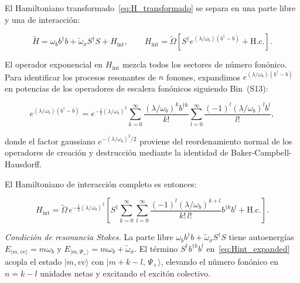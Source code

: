 \documentclass[12pt]{article}
\begin{document}
	
	El Hamiltoniano transformado~\eqref{eq:H_transformado} se separa en
	una parte libre y una de interacci\'on:
	
	\begin{equation}
		\widetilde{H} = \omega_b b^\dagger b + \widetilde\omega_\sigma S^\dagger S
		+ H_\mathrm{int},
		\qquad
		H_\mathrm{int} = \widetilde\Omega\left[
		S^\dagger e^{(\lambda/\omega_b)(b^\dagger - b)}
		+ \mathrm{H.c.}
		\right].
		\label{eq:Hint}
	\end{equation}
	
	\noindent
	El operador exponencial en $H_\mathrm{int}$ mezcla todos los sectores
	de n\'umero fon\'onico. Para identificar los procesos resonantes de
	$n$ fonones, expandimos $e^{(\lambda/\omega_b)(b^\dagger - b)}$ en
	potencias de los operadores de escalera fon\'onicos siguiendo
	Bin~(S13):
	
	\begin{equation}
		e^{(\lambda/\omega_b)(b^\dagger - b)}
		= e^{-\frac{1}{2}(\lambda/\omega_b)^2}
		\sum_{k=0}^\infty \frac{(\lambda/\omega_b)^k b^{\dagger k}}{k!}
		\sum_{l=0}^\infty \frac{(-1)^l(\lambda/\omega_b)^l b^l}{l!},
		\label{eq:exp_expansion}
	\end{equation}
	
	donde el factor gaussiano $e^{-(\lambda/\omega_b)^2/2}$ proviene del
	reordenamiento normal de los operadores de creaci\'on y destrucci\'on
	mediante la identidad de Baker-Campbell-Hausdorff.
	
	\medskip
	\noindent
	El Hamiltoniano de interacci\'on completo es entonces:
	
	\begin{equation}
		H_\mathrm{int} = \widetilde\Omega\,e^{-\frac{1}{2}(\lambda/\omega_b)^2}
		\left[S^\dagger
		\sum_{k=0}^\infty\sum_{l=0}^\infty
		\frac{(-1)^l(\lambda/\omega_b)^{k+l}}{k!\,l!}
		b^{\dagger k} b^l
		+ \mathrm{H.c.}\right].
		\label{eq:Hint_expanded}
	\end{equation}
	
	\medskip
	\noindent
	\textit{Condici\'on de resonancia Stokes.}
	La parte libre $\omega_b b^\dagger b + \widetilde\omega_\sigma S^\dagger S$
	tiene autoenerg\'ias $E_{|m, vv\rangle} = m\omega_b$ y
	$E_{|m, \Psi_+\rangle} = m\omega_b + \widetilde\omega_\sigma$.
	El t\'ermino $S^\dagger b^{\dagger k} b^l$ en~\eqref{eq:Hint_expanded}
	acopla el estado $|m, vv\rangle$ con $|m + k - l,\,\Psi_+\rangle$,
	elevando el n\'umero fon\'onico en $n = k - l$ unidades netas y
	excitando el excit\'on colectivo.
	
\end{document}
